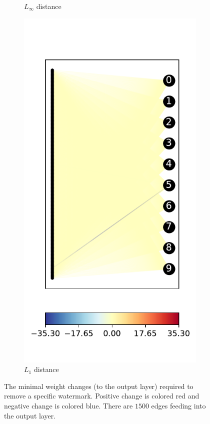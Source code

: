 \documentclass{easychair}
\begin{document}
\begin{figure}
{\begin{subfigure}{0.4\linewidth}
     \caption{$L_\infty$ distance}
  \end{subfigure}
  \begin{subfigure}{0.4\linewidth}
    \includegraphics[width=\linewidth]{../data/results/problem2/last_layer_1_wm_example.pdf}
    \caption{$L_1$ distance}
  \end{subfigure}
  }
  \caption{The minimal weight changes (to the output layer) required
    to remove a specific watermark. Positive change is colored red and
    negative change is colored blue. There are $1500$ edges feeding
    into the output layer.}
  \label{fig:lastLayerExampleSingle}
\end{figure}
\end{document}
